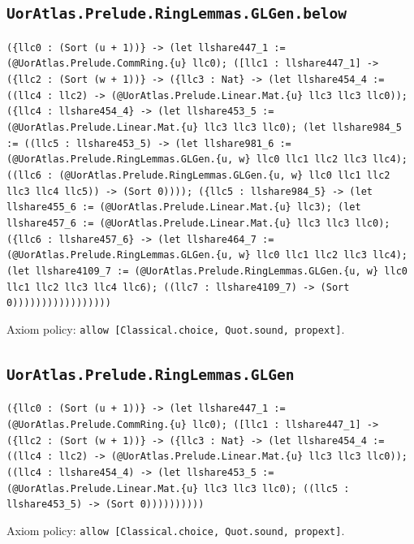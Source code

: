 \documentclass[11pt]{article}
\begin{document}
\subsection*{\texttt{UorAtlas.Prelude.RingLemmas.GLGen.below}}
\noindent\texttt{(\{llc0 : (Sort (u + 1))\} -> (let llshare447\_1 := (@UorAtlas.Prelude.CommRing.\{u\} llc0); ([llc1 : llshare447\_1] -> (\{llc2 : (Sort (w + 1))\} -> (\{llc3 : Nat\} -> (let llshare454\_4 := ((llc4 : llc2) -> (@UorAtlas.Prelude.Linear.Mat.\{u\} llc3 llc3 llc0)); (\{llc4 : llshare454\_4\} -> (let llshare453\_5 := (@UorAtlas.Prelude.Linear.Mat.\{u\} llc3 llc3 llc0); (let llshare984\_5 := ((llc5 : llshare453\_5) -> (let llshare981\_6 := (@UorAtlas.Prelude.RingLemmas.GLGen.\{u, w\} llc0 llc1 llc2 llc3 llc4); ((llc6 : (@UorAtlas.Prelude.RingLemmas.GLGen.\{u, w\} llc0 llc1 llc2 llc3 llc4 llc5)) -> (Sort 0)))); (\{llc5 : llshare984\_5\} -> (let llshare455\_6 := (@UorAtlas.Prelude.Linear.Mat.\{u\} llc3); (let llshare457\_6 := (@UorAtlas.Prelude.Linear.Mat.\{u\} llc3 llc3 llc0); (\{llc6 : llshare457\_6\} -> (let llshare464\_7 := (@UorAtlas.Prelude.RingLemmas.GLGen.\{u, w\} llc0 llc1 llc2 llc3 llc4); (let llshare4109\_7 := (@UorAtlas.Prelude.RingLemmas.GLGen.\{u, w\} llc0 llc1 llc2 llc3 llc4 llc6); ((llc7 : llshare4109\_7) -> (Sort 0)))))))))))))))))}\par
\noindent Axiom policy: \texttt{allow [Classical.choice, Quot.sound, propext]}.\par
\subsection*{\texttt{UorAtlas.Prelude.RingLemmas.GLGen}}
\noindent\texttt{(\{llc0 : (Sort (u + 1))\} -> (let llshare447\_1 := (@UorAtlas.Prelude.CommRing.\{u\} llc0); ([llc1 : llshare447\_1] -> (\{llc2 : (Sort (w + 1))\} -> (\{llc3 : Nat\} -> (let llshare454\_4 := ((llc4 : llc2) -> (@UorAtlas.Prelude.Linear.Mat.\{u\} llc3 llc3 llc0)); ((llc4 : llshare454\_4) -> (let llshare453\_5 := (@UorAtlas.Prelude.Linear.Mat.\{u\} llc3 llc3 llc0); ((llc5 : llshare453\_5) -> (Sort 0))))))))))}\par
\noindent Axiom policy: \texttt{allow [Classical.choice, Quot.sound, propext]}.\par
\end{document}
